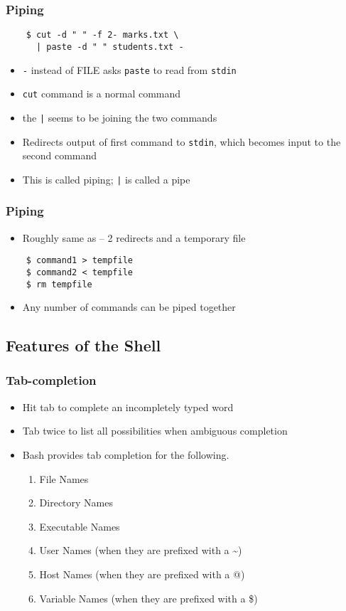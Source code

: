 \documentclass[12pt,compress]{beamer}
\begin{document}
\begin{frame}[fragile]
  \frametitle{Piping}
  \begin{lstlisting}
    $ cut -d " " -f 2- marks.txt \
      | paste -d " " students.txt -
  \end{lstlisting} %
  \begin{itemize}
  \item \texttt{-} instead of FILE asks \texttt{paste} to read from
    \texttt{stdin}
  \item \texttt{cut} command is a normal command
  \item the \texttt{|} seems to be joining the two commands
  \item Redirects output of first command to \texttt{stdin}, which
    becomes input to the second command
  \item This is called piping; \texttt{|} is called a pipe
  \end{itemize}
\end{frame}

\begin{frame}[fragile]
  \frametitle{Piping}
  \begin{itemize}
  \item Roughly same as -- 2 redirects and a temporary file
  \end{itemize}
  \begin{lstlisting}
    $ command1 > tempfile
    $ command2 < tempfile
    $ rm tempfile
  \end{lstlisting} %
  \begin{itemize}
  \item Any number of commands can be piped together
  \end{itemize}
\end{frame}

\subsection{Features of the Shell}

\begin{frame}[fragile]
  \frametitle{Tab-completion}
  \begin{itemize}
  \item Hit tab to complete an incompletely typed word
  \item Tab twice to list all possibilities when ambiguous completion
  \item Bash provides tab completion for the following.
    \begin{enumerate}
    \item File Names
    \item Directory Names
    \item Executable Names
    \item User Names (when they are prefixed with a \~{})
    \item Host Names (when they are prefixed with a @)
    \item Variable Names (when they are prefixed with a \$)
    \end{enumerate}
  \end{itemize}
\end{frame}
\end{document}

